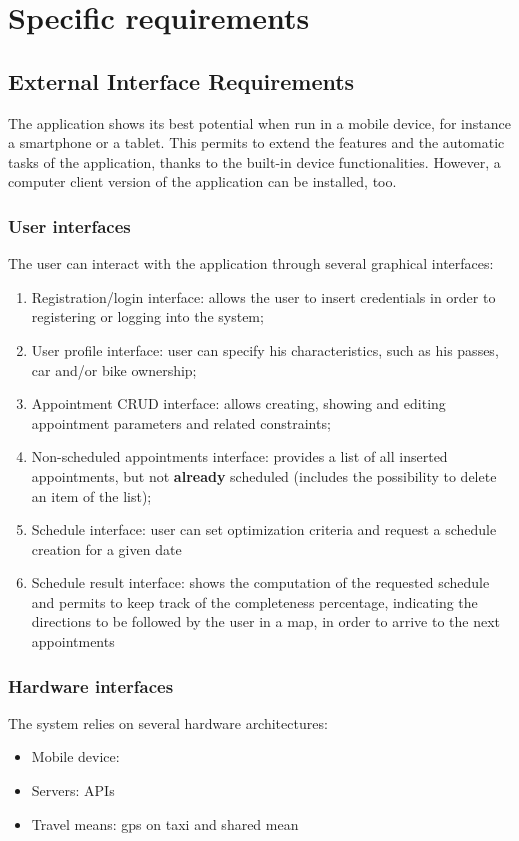 \chapter{Specific requirements}

\section{External Interface Requirements}
The application shows its best potential when run in a mobile device, for instance a smartphone or a tablet. This permits to extend the features and the automatic tasks of the application, thanks to the built-in device functionalities. However, a computer client version of the application can be installed, too.

\subsection{User interfaces}
The user can interact with the application through several graphical interfaces:
\begin{enumerate}
\item Registration/login interface: allows the user to insert credentials in order to registering or logging into the system;
\item User profile interface: user can specify his characteristics, such as his passes, car and/or bike ownership;
\item Appointment CRUD interface: allows creating, showing and editing appointment parameters and related constraints;
\item Non-scheduled appointments interface: provides a list of all inserted appointments, but not \textbf{already} scheduled (includes the possibility to delete an item of the list);
\item Schedule interface: user can set optimization criteria and request a schedule creation for a given date
\item Schedule result interface: shows the computation of the requested schedule and permits to keep track of the completeness percentage, indicating the directions to be followed by the user in a map, in order to arrive to the next appointments
\end{enumerate}


\subsection{Hardware interfaces}
The system relies on several hardware architectures:
\begin{itemize}
\item Mobile device:
\item Servers: APIs
\item Travel means: gps on taxi and shared mean
\end{itemize}

